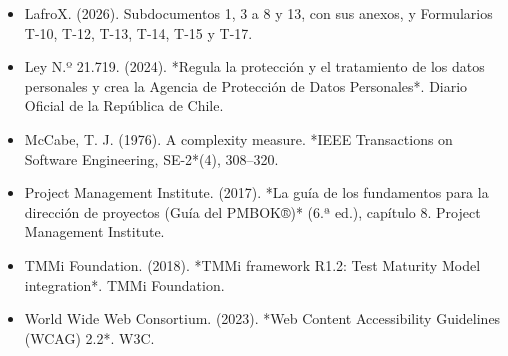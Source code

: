 \begin{itemize}
\item LafroX. (2026). Subdocumentos 1, 3 a 8 y 13, con sus anexos, y Formularios T-10, T-12, T-13, T-14, T-15 y T-17.
\item Ley N.º 21.719. (2024). *Regula la protección y el tratamiento de los datos personales y crea la Agencia de Protección de Datos Personales*. Diario Oficial de la República de Chile.
\item McCabe, T. J. (1976). A complexity measure. *IEEE Transactions on Software Engineering, SE-2*(4), 308–320.
\item Project Management Institute. (2017). *La guía de los fundamentos para la dirección de proyectos (Guía del PMBOK®)* (6.ª ed.), capítulo 8. Project Management Institute.
\item TMMi Foundation. (2018). *TMMi framework R1.2: Test Maturity Model integration*. TMMi Foundation.
\item World Wide Web Consortium. (2023). *Web Content Accessibility Guidelines (WCAG) 2.2*. W3C.
\end{itemize}

